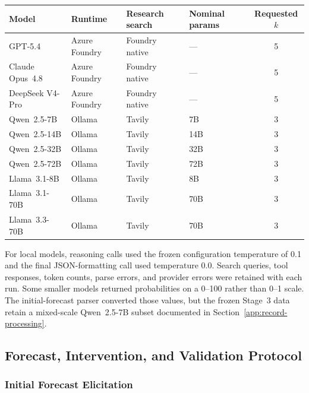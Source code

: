 \begin{center}
\begin{minipage}{\linewidth}
\centering
{}
\label{tab:agent-roster}
\small
\begin{tabular}{llllc}
\toprule
\textbf{Model} & \textbf{Runtime} & \textbf{Research search} &
\textbf{Nominal params} & \textbf{Requested $k$} \\
\midrule
GPT-5.4          & Azure Foundry & Foundry native & --- & 5 \\
Claude Opus~4.8  & Azure Foundry & Foundry native & --- & 5 \\
DeepSeek V4-Pro  & Azure Foundry & Foundry native & --- & 5 \\
Qwen~2.5-7B      & Ollama & Tavily & 7B  & 3 \\
Qwen~2.5-14B     & Ollama & Tavily & 14B & 3 \\
Qwen~2.5-32B     & Ollama & Tavily & 32B & 3 \\
Qwen~2.5-72B     & Ollama & Tavily & 72B & 3 \\
Llama~3.1-8B     & Ollama & Tavily & 8B  & 3 \\
Llama~3.1-70B    & Ollama & Tavily & 70B & 3 \\
Llama~3.3-70B    & Ollama & Tavily & 70B & 3 \\
\bottomrule
\end{tabular}
\end{minipage}
\end{center}

For local models, reasoning calls used the frozen configuration temperature of 0.1 and
the final JSON-formatting call used temperature 0.0.  Search queries, tool responses,
token counts, parse errors, and provider errors were retained with each run.  Some
smaller models returned probabilities on a 0--100 rather than 0--1 scale.  The
initial-forecast parser converted those values, but the frozen Stage~3 data retain a
mixed-scale Qwen~2.5-7B subset documented in
Section~\ref{app:record-processing}.

\subsection{Forecast, Intervention, and Validation Protocol}
\label{app:exp1-protocol}

\subsubsection{Initial Forecast Elicitation}
\label{app:prompts}

